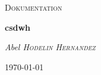 \begin{titlepage}
	\thispagestyle{firstpage}
	
	\centering
	\vspace*{5cm}
	{\scshape\LARGE Dokumentation\par}
	\vspace{1.5cm}
	{\huge \bfseries \ac{csdwh}\par}
	\vspace{2cm}
	{\Large \itshape Abel \textsc{Hodelin Hernandez}\par}
	\vfill
	
	{\large \today\par}
\end{titlepage}